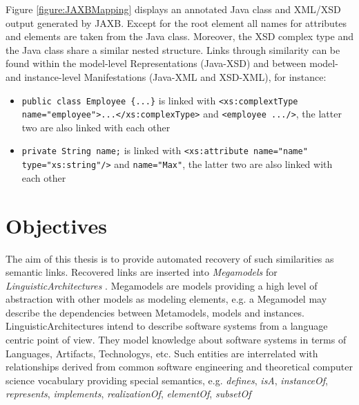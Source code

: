 Figure \ref{figure:JAXBMapping} displays an annotated \gls{Java} class and \gls{XML}/\gls{XSD} output generated by \gls{JAXB}.
Except for the root element all names for attributes and elements are taken from the \gls{Java} class.
Moreover, the \gls{XSD} complex type and the \gls{Java} class share a similar nested structure.
Links through similarity can be found within the model-level \glspl{Representation} (\gls{Java}-\gls{XSD}) and between model- and instance-level \glspl{Manifestation} (\gls{Java}-\gls{XML} and \gls{XSD}-\gls{XML}), for instance:
\begin{itemize}
\item
\texttt{public class Employee \{...\}} is linked with \texttt{<xs:complextType name="employee">...</xs:complexType>}
and \texttt{<employee .../>}, the latter two are also linked with each other

\item
\texttt{private String name;} is linked with \texttt{<xs:attribute name="name" type="xs:string"/>} and \texttt{name="Max"}, the latter two are also linked with each other
\end{itemize}


\section{Objectives}
\label{section:Objectives}

The aim of this thesis is to provide automated recovery of such similarities as semantic links.
Recovered links are inserted into \textit{\glspl{Megamodel}} \cite{DBLP:conf/sattose/BaggeZ14} for \textit{\glspl{LinguisticArchitecture}} \cite{DBLP:conf/models/FavreLV12} \cite{DBLP:conf/ecmdafa/LammelV14} \cite{DBLP:conf/modelsward/HeinzLV17}.
\Glspl{Megamodel} are models providing a high level of abstraction with other models as modeling elements, e.g. a \gls{Megamodel} may describe the dependencies between \glspl{Metamodel}, models and instances.
\Glspl{LinguisticArchitecture} intend to describe software systems from a language centric point of view.
They model knowledge about software systems in terms of \glspl{Language}, \glspl{Artifact}, \glspl{Technology}, etc. \cite{LukasHaertelBScThesis} \cite{DBLP:conf/models/FavreLV12} \cite{DBLP:conf/ecmdafa/LammelV14}
Such entities are interrelated with relationships derived from common software engineering and theoretical computer science vocabulary providing special semantics, e.g. \textit{defines}, \textit{isA}, \textit{instanceOf}, \textit{represents}, \textit{implements}, \textit{realizationOf}, \textit{elementOf}, \textit{subsetOf} \cite{DBLP:conf/modelsward/HeinzLV17}

